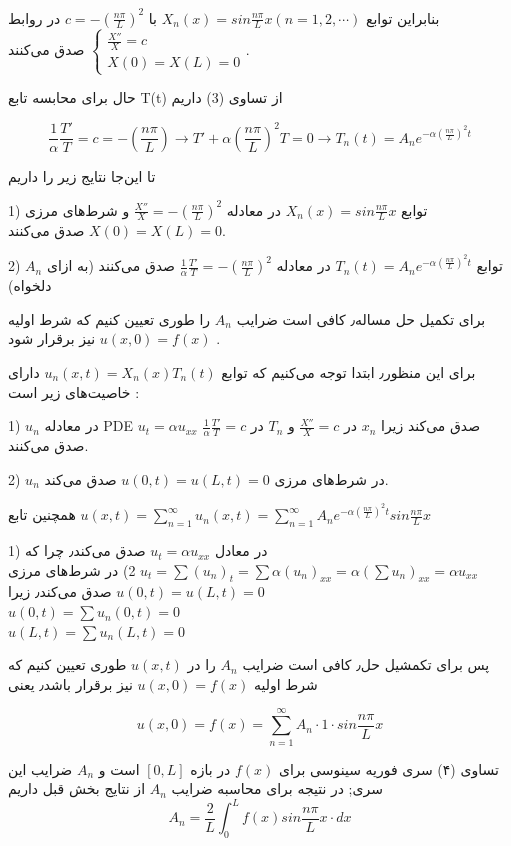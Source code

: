 \begin{problem}
\begin{enumerate}
بنابراین توابع 
$
X_n(x) = sin \frac {n \pi }{L}x
(n = 1,2,\cdots)
$
با 
$c = - (\frac{n\pi}{L})^2$
در روابط 
$
\begin{cases}
	\frac{X''}{X} = c
	\\
	X(0) = X(L) = 0
\end{cases}
$
صدق می‌کنند.

حال برای محابسه تابع 
T(t)
از تساوی (3) داریم

\begin{equation*}
	\frac{1}{\alpha} \frac{T'}{T} = c = -(\frac{n\pi}{L})
	\rightarrow T' + \alpha(\frac{n\pi}{L})^2 T = 0 
	\rightarrow T_n(t) = A_n e ^ {-\alpha (\frac{n\pi}{L})^2 t}
\end{equation*}

تا این‌جا نتایج زیر را داریم 

1)
توابع
$X_n(x) = sin \frac {n \pi }{L}x$
در معادله 
$\frac{X''}{X} = -(\frac {n \pi }{L})^2$
و شرط‌های مرزی
$X(0) = X(L) = 0$
صدق می‌کنند.

2)
توابع 
$T_n(t) = A_n e ^ {-\alpha (\frac{n\pi}{L})^2 t}
 $
در معادله 
$
\frac{1}{\alpha} \frac{T'}{T} = -(\frac {n \pi }{L})^2
$
صدق می‌کنند
(به ازای 
$A_n$
دلخواه)

برای تکمیل حل مساله٫ کافی است ضرایب 
$A_n$
را طوری تعیین کنیم که شرط اولیه 
$u(x,0) = f(x)$
نیز برقرار شود
.

برای این منظور٫
ابتدا توجه می‌کنیم که توابع 
$u_n(x,t) = X_n(x) T_n(t)$
دارای خاصیت‌های زیر است
:

1)
$u_n$
در معادله 
PDE 
\;
$u_t = \alpha u_{xx}$
صدق می‌کند
زیرا 
$x_n$
در 
$\frac{X''}{X} = c$
و 
$T_n$
در 
$\frac{1}{\alpha} \frac {T'}{T} = c$
صدق می‌کنند.

2)
$u_n$
در شرط‌های مرزی 
$u(0,t) = u(L,t) = 0$
صدق می‌کند.

همچنین تابع 
$u(x,t) = \sum_{n=1}^{\infty} u_n(x,t) = \sum_{n=1}^{\infty} A_n e ^ {-\alpha (\frac{n\pi}{L})^2t} sin \frac{n\pi}{L}x$

1)
در معادل 
$u_t = \alpha u_{xx}$
صدق می‌کند٫ چرا که
$u_t = \sum(u_n)_t = \sum \alpha (u_n)_{xx} = \alpha (\sum u_n)_{xx} = \alpha u_{xx}$
2)
در شرط‌های مرزی 
$u(0,t) = u(L,t) = 0$
صدق می‌کند٫ زیرا
\\
$u(0,t) = \sum u_n (0,t) = 0$
\\
$u(L,t) = \sum u_n (L,t) = 0$

پس برای تکمشیل حل٫ کافی است ضرایب 
$A_n$
را در 
$u(x,t)$
طوری تعیین کنیم که شرط اولیه 
$u(x,0) = f(x)$
نیز برقرار باشد٫ یعنی

\begin{equation}
u(x,0) = f(x) = \sum_{n=1}^{\infty} A_n \cdot 1 \cdot sin \frac {n\pi}{L}x 
\end{equation}

تساوی (۴) سری فوریه سینوسی برای 
$f(x)$
در بازه 
$[0,L]$
است و 
$A_n$
ضرایب این سری;
در نتیجه برای محاسبه ضرایب 
$A_n$
از نتایج بخش قبل داریم
\[
A_n = \frac{2}{L} \int_0^L f(x) sin\frac{n\pi}{L}x\cdot dx
\] 
\end{enumerate}

\end{problem} 

